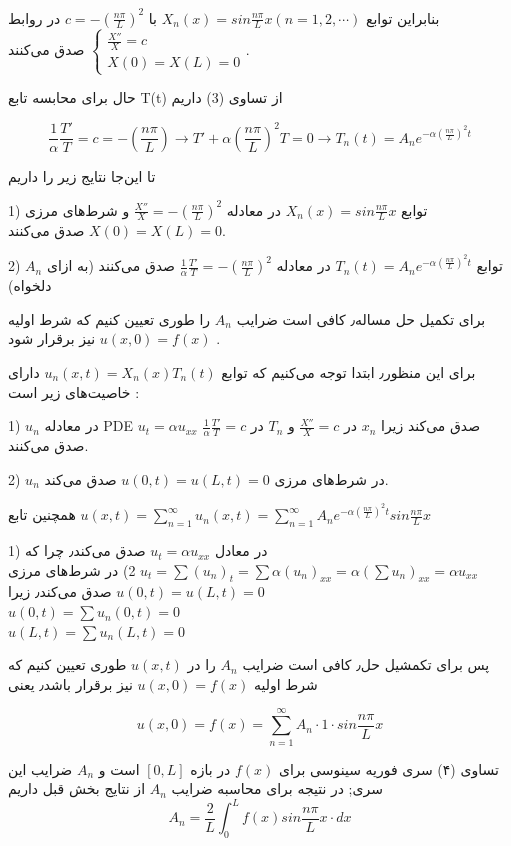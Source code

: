 \begin{problem}
\begin{enumerate}
بنابراین توابع 
$
X_n(x) = sin \frac {n \pi }{L}x
(n = 1,2,\cdots)
$
با 
$c = - (\frac{n\pi}{L})^2$
در روابط 
$
\begin{cases}
	\frac{X''}{X} = c
	\\
	X(0) = X(L) = 0
\end{cases}
$
صدق می‌کنند.

حال برای محابسه تابع 
T(t)
از تساوی (3) داریم

\begin{equation*}
	\frac{1}{\alpha} \frac{T'}{T} = c = -(\frac{n\pi}{L})
	\rightarrow T' + \alpha(\frac{n\pi}{L})^2 T = 0 
	\rightarrow T_n(t) = A_n e ^ {-\alpha (\frac{n\pi}{L})^2 t}
\end{equation*}

تا این‌جا نتایج زیر را داریم 

1)
توابع
$X_n(x) = sin \frac {n \pi }{L}x$
در معادله 
$\frac{X''}{X} = -(\frac {n \pi }{L})^2$
و شرط‌های مرزی
$X(0) = X(L) = 0$
صدق می‌کنند.

2)
توابع 
$T_n(t) = A_n e ^ {-\alpha (\frac{n\pi}{L})^2 t}
 $
در معادله 
$
\frac{1}{\alpha} \frac{T'}{T} = -(\frac {n \pi }{L})^2
$
صدق می‌کنند
(به ازای 
$A_n$
دلخواه)

برای تکمیل حل مساله٫ کافی است ضرایب 
$A_n$
را طوری تعیین کنیم که شرط اولیه 
$u(x,0) = f(x)$
نیز برقرار شود
.

برای این منظور٫
ابتدا توجه می‌کنیم که توابع 
$u_n(x,t) = X_n(x) T_n(t)$
دارای خاصیت‌های زیر است
:

1)
$u_n$
در معادله 
PDE 
\;
$u_t = \alpha u_{xx}$
صدق می‌کند
زیرا 
$x_n$
در 
$\frac{X''}{X} = c$
و 
$T_n$
در 
$\frac{1}{\alpha} \frac {T'}{T} = c$
صدق می‌کنند.

2)
$u_n$
در شرط‌های مرزی 
$u(0,t) = u(L,t) = 0$
صدق می‌کند.

همچنین تابع 
$u(x,t) = \sum_{n=1}^{\infty} u_n(x,t) = \sum_{n=1}^{\infty} A_n e ^ {-\alpha (\frac{n\pi}{L})^2t} sin \frac{n\pi}{L}x$

1)
در معادل 
$u_t = \alpha u_{xx}$
صدق می‌کند٫ چرا که
$u_t = \sum(u_n)_t = \sum \alpha (u_n)_{xx} = \alpha (\sum u_n)_{xx} = \alpha u_{xx}$
2)
در شرط‌های مرزی 
$u(0,t) = u(L,t) = 0$
صدق می‌کند٫ زیرا
\\
$u(0,t) = \sum u_n (0,t) = 0$
\\
$u(L,t) = \sum u_n (L,t) = 0$

پس برای تکمشیل حل٫ کافی است ضرایب 
$A_n$
را در 
$u(x,t)$
طوری تعیین کنیم که شرط اولیه 
$u(x,0) = f(x)$
نیز برقرار باشد٫ یعنی

\begin{equation}
u(x,0) = f(x) = \sum_{n=1}^{\infty} A_n \cdot 1 \cdot sin \frac {n\pi}{L}x 
\end{equation}

تساوی (۴) سری فوریه سینوسی برای 
$f(x)$
در بازه 
$[0,L]$
است و 
$A_n$
ضرایب این سری;
در نتیجه برای محاسبه ضرایب 
$A_n$
از نتایج بخش قبل داریم
\[
A_n = \frac{2}{L} \int_0^L f(x) sin\frac{n\pi}{L}x\cdot dx
\] 
\end{enumerate}

\end{problem} 

